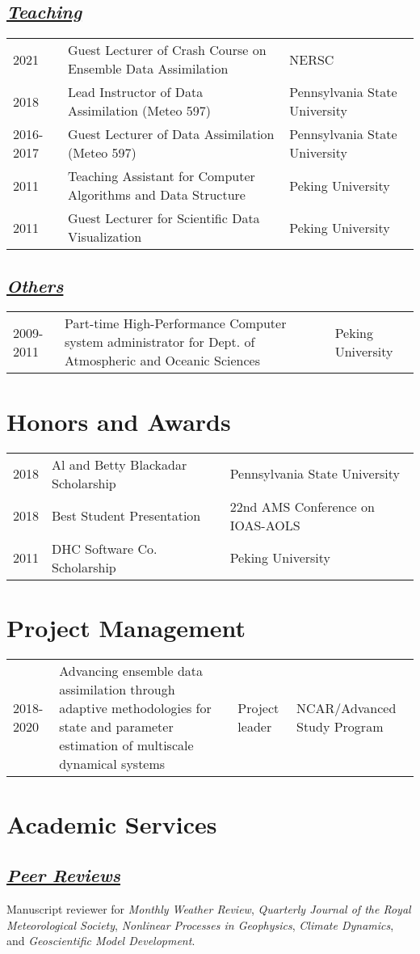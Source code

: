 \documentclass{article}
\newcommand{\cvsection}[1]{\section*{\bfseries#1}}
\newcommand{\cvsubsection}[1]{\subsection*{\itshape\uline{#1}}}
\begin{document}
\cvsubsection{Teaching}
\begin{tabular}{l p{9cm} l}
    2021 & Guest Lecturer of Crash Course on Ensemble Data Assimilation & NERSC \\
    2018 & Lead Instructor of Data Assimilation (Meteo 597) & Pennsylvania State University \\
    2016-2017 & Guest Lecturer of Data Assimilation (Meteo 597) & Pennsylvania State University \\
    2011 & Teaching Assistant for Computer Algorithms and Data Structure & Peking University \\
    2011 & Guest Lecturer for Scientific Data Visualization & Peking University \\
\end{tabular}

\cvsubsection{Others}
\begin{tabular}{l p{9cm} l}
    2009-2011 & Part-time High-Performance Computer system administrator for Dept. of Atmospheric and Oceanic Sciences & Peking University \\
\end{tabular}

\cvsection{Honors and Awards}
\begin{tabular}{l l l}
    2018 & Al and Betty Blackadar Scholarship & Pennsylvania State University \\
    2018 & Best Student Presentation & 22nd AMS Conference on IOAS-AOLS \\
    2011 & DHC Software Co. Scholarship & Peking University \\
\end{tabular}


\cvsection{Project Management}
\begin{tabular}{l p{8cm} p{2cm} p{3cm}}
    2018-2020 & Advancing ensemble data assimilation through adaptive methodologies for state and parameter estimation of multiscale dynamical systems & Project leader & NCAR/Advanced Study Program \\
\end{tabular}


\cvsection{Academic Services}
\cvsubsection{Peer Reviews}
Manuscript reviewer for
\textit{Monthly Weather Review},
\textit{Quarterly Journal of the Royal Meteorological Society},
\textit{Nonlinear Processes in Geophysics},
\textit{Climate Dynamics},
and
\textit{Geoscientific Model Development}.
\end{document}
